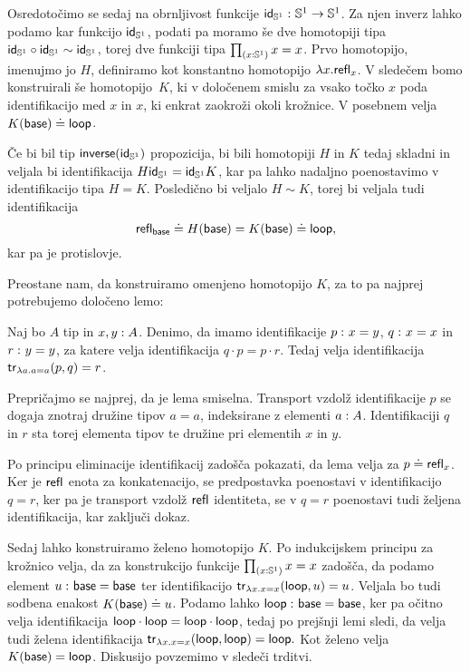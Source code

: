 Osredotočimo se sedaj na obrnljivost funkcije \(\textnormal{\textsf{id}}_{\mathbb{S}^{1}} \,\colon \mathbb{S}^{1} \to \mathbb{S}^{1}\). Za njen inverz lahko podamo kar funkcijo \(\textnormal{\textsf{id}}_{\mathbb{S}^{1}}\), podati pa moramo še dve homotopiji tipa \(\textnormal{\textsf{id}}_{\mathbb{S}^{1}} \circ \textnormal{\textsf{id}}_{\mathbb{S}^{1}} \sim \textnormal{\textsf{id}}_{\mathbb{S}^{1}}\), torej dve funkciji tipa \(\textstyle \prod_{\left( {x : \mathbb{S}^{1}} \right)} x = x\). Prvo homotopijo, imenujmo jo \(H\), definiramo kot konstantno homotopijo \(\lambda x.\textnormal{\textsf{refl}}_{x}\). V sledečem bomo konstruirali še homotopijo~\(K\), ki v določenem smislu za vsako točko \(x\) poda identifikacijo med \(x\) in \(x\), ki enkrat zaokroži okoli krožnice. V posebnem velja \(K(\textnormal{\textsf{base}}) \doteq \textnormal{\textsf{loop}}\).

Če bi bil tip \(\textnormal{\textsf{inverse}}(\textnormal{\textsf{id}}_{\mathbb{S}^{1}})\) propozicija, bi bili homotopiji \(H\) in \(K\) tedaj skladni in veljala bi identifikacija \(H\textnormal{\textsf{id}}_{\mathbb{S}^{1}} = \textnormal{\textsf{id}}_{\mathbb{S}^{1}}K\), kar pa lahko nadaljno poenostavimo v identifikacijo tipa \(H = K\). Posledično bi veljalo \(H \sim K\), torej bi veljala tudi identifikacija
\[\textnormal{\textsf{refl}}_{\textnormal{\textsf{base}}} \doteq H(\textnormal{\textsf{base}}) = K(\textnormal{\textsf{base}}) \doteq \textnormal{\textsf{loop}},\]
kar pa je protislovje.

Preostane nam, da konstruiramo omenjeno homotopijo \(K\), za to pa najprej potrebujemo določeno lemo:

\begin{lema}
  \label{transp-lemma}
  Naj bo \(A\) tip in \({x, y : A}\). Denimo, da imamo identifikacije \(p \,\colon x = y\), \(q \,\colon x = x\) in \(r \,\colon y = y\), za katere velja identifikacija  \(q \cdot p = p \cdot r\). Tedaj velja identifikacija \(\textnormal{\textsf{tr}}_{\lambda a. a = a}(p, q) = r\).
\end{lema}

\begin{dokaz}
  Prepričajmo se najprej, da je lema smiselna. Transport vzdolž identifikacije \(p\) se dogaja znotraj družine tipov \(a = a\), indeksirane z elementi \({a : A}\). Identifikaciji \(q\) in \(r\) sta torej elementa tipov te družine pri elementih \(x\) in \(y\).

  Po principu eliminacije identifikacij zadošča pokazati, da lema velja za \(p \doteq \textnormal{\textsf{refl}}_{x}\). Ker je \(\textnormal{\textsf{refl}}_{}\) enota za konkatenacijo, se predpostavka poenostavi v identifikacijo \(q = r\), ker pa je transport vzdolž \(\textnormal{\textsf{refl}}_{}\) identiteta, se v \(q = r\) poenostavi tudi željena identifikacija, kar zaključi dokaz.
\end{dokaz}

Sedaj lahko konstruiramo želeno homotopijo \(K\). Po indukcijskem principu za krožnico velja, da za konstrukcijo funkcije \(\textstyle \prod_{\left( {x : \mathbb{S}^{1}} \right)} x = x\) zadošča, da podamo element \(u \,\colon \textnormal{\textsf{base}} = \textnormal{\textsf{base}}\) ter identifikacijo \(\textnormal{\textsf{tr}}_{\lambda x. x = x}(\textnormal{\textsf{loop}}, u) = u\). Veljala bo tudi sodbena enakost \(K(\textnormal{\textsf{base}}) \doteq u\).
Podamo lahko \(\textnormal{\textsf{loop}} \,\colon \textnormal{\textsf{base}} = \textnormal{\textsf{base}}\), ker pa očitno velja identifikacija \(\textnormal{\textsf{loop}} \cdot \textnormal{\textsf{loop}} = \textnormal{\textsf{loop}} \cdot \textnormal{\textsf{loop}}\), tedaj po prejšnji lemi sledi, da velja tudi želena identifikacija \(\textnormal{\textsf{tr}}_{\lambda x. x = x}(\textnormal{\textsf{loop}}, \textnormal{\textsf{loop}}) = \textnormal{\textsf{loop}}.\)
Kot želeno velja \(K(\textnormal{\textsf{base}}) = \textnormal{\textsf{loop}}\). Diskusijo povzemimo v sledeči trditvi.

